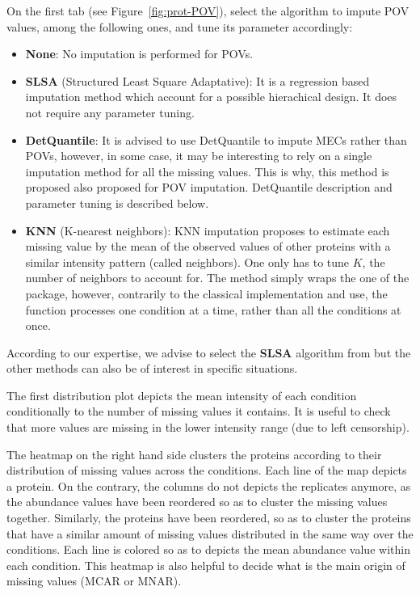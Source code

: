 \documentclass[12pt]{article}
\begin{document}
On the first tab (see Figure~\ref{fig:prot-POV}), select the algorithm to impute POV values, among the following ones, and tune its parameter accordingly:
\begin{itemize}
	\item \textbf{None}: No imputation is performed for POVs.
	\item \textbf{SLSA} (Structured Least Square Adaptative): It is a regression based imputation method which account for a possible hierachical design. It does not require any parameter tuning.
	\item \textbf{DetQuantile}: It is advised to use DetQuantile to impute MECs rather than POVs, however, in some case, it may be interesting to rely on a single imputation method for all the missing values. This is why, this method is proposed also proposed for POV imputation. DetQuantile description and parameter tuning is described below.
	\item \textbf{KNN} (K-nearest neighbors):  KNN imputation proposes to estimate each missing value by the mean of the observed values of other proteins with a similar intensity pattern (called neighbors). One only has to tune $K$, the number of neighbors to account for. The method simply wraps the one of the  package, however, contrarily to the classical implementation and use, the function processes one condition at a time, rather than all the conditions at once. 
\end{itemize}
According to our expertise, we advise to select the \textbf{SLSA} algorithm from  but the other methods can also be of interest in specific situations.

The first distribution plot depicts the mean intensity of each condition conditionally to the number of missing values it contains.
It is useful to check that more values are missing in the lower intensity range (due to left censorship).

The heatmap on the right hand side clusters the proteins according to their 
distribution of missing values across the conditions. Each line of the map 
depicts a protein. On the contrary, the columns do not depicts the replicates 
anymore, as the abundance values have been reordered so as to cluster the 
missing values together. Similarly, the proteins have been reordered, so as 
to cluster the proteins that have a similar amount of missing values 
distributed in the same way over the conditions. Each line is colored so as 
to depicts the mean abundance value within each condition. This heatmap is 
also helpful to decide what is the main origin of missing values (MCAR or MNAR).
\end{document}
